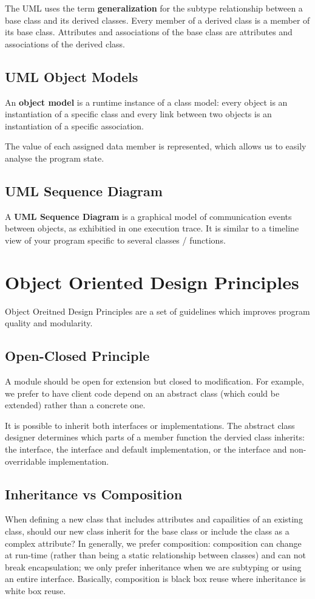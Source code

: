 \documentclass[12pt]{article}
\begin{document}
The UML uses the term {\bf generalization} for the subtype relationship between a base class and its derived classes. Every member of a derived class is a member of its base class. Attributes and associations of the base class are attributes and associations of the derived class.

\subsection{UML Object Models}
An {\bf object model} is a runtime instance of a class model: every object is an instantiation of a specific class and every link between two objects is an instantiation of a specific association.

The value of each assigned data member is represented, which allows us to easily analyse the program state.

\subsection{UML Sequence Diagram}
A {\bf UML Sequence Diagram} is a graphical model of communication events between objects, as exhibitied in one execution trace. It is similar to a timeline view of your program specific to several classes / functions.

\section{Object Oriented Design Principles}
Object Oreitned Design Principles are a set of guidelines which improves program quality and modularity.

\subsection{Open-Closed Principle}
A module should be open for extension but closed to modification. For example, we prefer to have client code depend on an abstract class (which could be extended) rather than a concrete one.

It is possible to inherit both interfaces or implementations. The abstract class designer determines which parts of a member function the dervied class inherits: the interface, the interface and default implementation, or the interface and non-overridable implementation.

\subsection{Inheritance vs Composition}
When defining a new class that includes attributes and capailities of an existing class, should our new class inherit for the base class or include the class as a complex attribute? In generally, we prefer composition: composition can change at run-time (rather than being a static relationship between classes) and can not break encapsulation; we only prefer inheritance when we are subtyping or using an entire interface. Basically, composition is black box reuse where inheritance is white box reuse.
\end{document}
